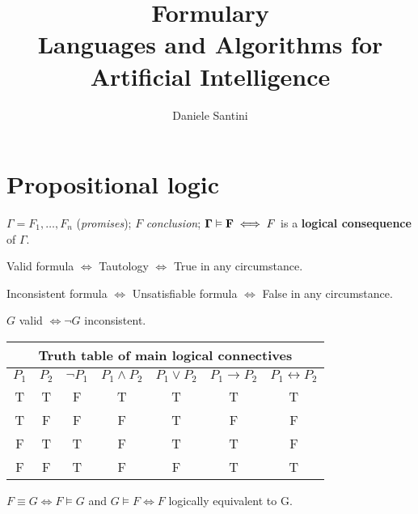 \documentclass[]{article}
\title{Formulary \\ \large Languages and Algorithms for Artificial Intelligence}
\author{Daniele Santini}
\begin{document}
\maketitle

\section{Propositional logic}
	
	\noindent $\Gamma = F_1,\dots,F_n$ (\textit{promises});
	$F$ \textit{conclusion}; 	
	$\bold{\Gamma \vDash F} \iff F$ is a \textbf{logical consequence} of $\Gamma$.
	
	\noindent Valid formula $\iff$ Tautology $\iff$ True in any circumstance.
	
	\noindent Inconsistent formula $\iff$ Unsatisfiable formula $\iff$ False in any circumstance.
	
	\noindent $G$ valid $\iff \neg G$ inconsistent.
	
	\begin{center}
		\begin{tabular}{ |c |c|c | c | c| c | c | } 
			\hline
			\multicolumn{7}{|c|}{Truth table of main logical connectives} \\
			\hline
			\textbf{$P_1$} & \textbf{$P_2$} & \textbf{$\neg P_1$} & \textbf{$P_1 \land P_2$} & \textbf{$P_1 \lor P_2$} & \textbf{$P_1 \rightarrow P_2$} & \textbf{$P_1 \leftrightarrow P_2$} \\
			\hline
			T & T & F & T & T & T & T \\
			\hline
			T & F & F & F & T & F & F \\
			\hline
			F & T & T & F & T & T & F \\
			\hline
			F & F & T & F & F & T & T \\
			\hline
		\end{tabular}
	\end{center}

	\noindent $F \equiv G \iff F \vDash G$ and $G \vDash F \iff F$ logically equivalent to G.
	
\end{document}
